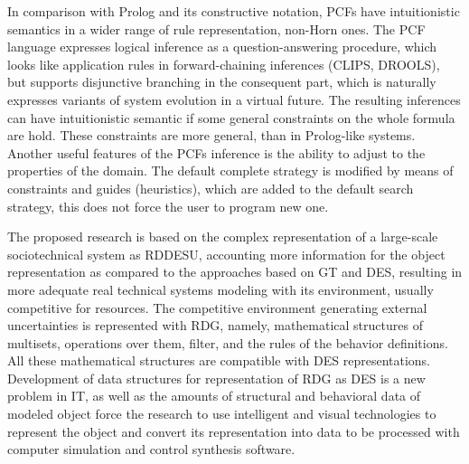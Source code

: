 \documentclass[conference,a4paper]{IEEEtran}
\begin{document}
In comparison with Prolog and its constructive notation, PCFs have intuitionistic semantics in a wider range of rule representation, non-Horn ones. The PCF language expresses logical inference as a question-answering procedure, which looks like application rules in forward-chaining inferences (CLIPS, DROOLS), but supports disjunctive branching in the consequent part, which is naturally expresses variants of system evolution in a virtual future. The resulting inferences can have intuitionistic semantic if some general constraints on the whole formula are hold. These constraints are more general, than in Prolog-like systems. Another useful features of the PCFs inference is the ability to adjust to the properties of the domain. The default complete strategy is modified by means of constraints and guides (heuristics), which are added to the default search strategy, this does not force the user to program new one.



The proposed research is based on the complex representation of a large-scale sociotechnical system as RDDESU, accounting more information for the object representation as compared to the approaches based on GT and DES, resulting in more adequate real technical systems modeling with its environment, usually competitive for resources. The competitive environment generating external uncertainties is represented with RDG, namely, mathematical structures of multisets, operations over them, filter, and the rules of the behavior definitions.  All these mathematical structures are compatible with DES representations.  Development of data structures for representation of RDG as DES is a new problem in IT, as well as the amounts of structural and behavioral data of modeled object force the research to use intelligent and visual technologies to represent the object and convert its representation into data to be processed with computer simulation and control synthesis software.


\end{document}

